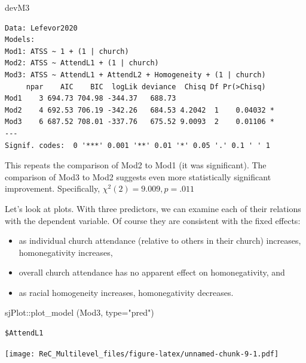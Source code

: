 \documentclass[
  english,
]{book}
\newenvironment{Shaded}{\begin{snugshade}}{\end{snugshade}}
\newcommand{\AttributeTok}[1]{\textcolor[rgb]{0.77,0.63,0.00}{#1}}
\newcommand{\FunctionTok}[1]{\textcolor[rgb]{0.00,0.00,0.00}{#1}}
\newcommand{\NormalTok}[1]{#1}
\newcommand{\SpecialCharTok}[1]{\textcolor[rgb]{0.00,0.00,0.00}{#1}}
\newcommand{\StringTok}[1]{\textcolor[rgb]{0.31,0.60,0.02}{#1}}
\providecommand{\tightlist}{%
  \setlength{\itemsep}{0pt}\setlength{\parskip}{0pt}}
\begin{document}
\begin{Shaded}
\begin{Highlighting}[]
\NormalTok{devM3}
\end{Highlighting}
\end{Shaded}

\begin{verbatim}
Data: Lefevor2020
Models:
Mod1: ATSS ~ 1 + (1 | church)
Mod2: ATSS ~ AttendL1 + (1 | church)
Mod3: ATSS ~ AttendL1 + AttendL2 + Homogeneity + (1 | church)
     npar    AIC    BIC  logLik deviance  Chisq Df Pr(>Chisq)  
Mod1    3 694.73 704.98 -344.37   688.73                       
Mod2    4 692.53 706.19 -342.26   684.53 4.2042  1    0.04032 *
Mod3    6 687.52 708.01 -337.76   675.52 9.0093  2    0.01106 *
---
Signif. codes:  0 '***' 0.001 '**' 0.01 '*' 0.05 '.' 0.1 ' ' 1
\end{verbatim}

This repeats the comparison of Mod2 to Mod1 (it was significant). The comparison of Mod3 to Mod2 suggests even more statistically significant improvement. Specifically, \(\chi ^{2}(2) = 9.009, p = .011\)

Let's look at plots. With three predictors, we can examine each of their relations with the dependent variable. Of course they are consistent with the fixed effects:

\begin{itemize}
\tightlist
\item
  as individual church attendance (relative to others in their church) increases, homonegativity increases,
\item
  overall church attendance has no apparent effect on homonegativity, and
\item
  as racial homogeneity increases, homonegativity decreases.
\end{itemize}

\begin{Shaded}
\begin{Highlighting}[]
\NormalTok{sjPlot}\SpecialCharTok{::}\FunctionTok{plot\_model}\NormalTok{ (Mod3, }\AttributeTok{type=}\StringTok{"pred"}\NormalTok{)}
\end{Highlighting}
\end{Shaded}

\begin{verbatim}
$AttendL1
\end{verbatim}

\texttt{[image: ReC\_Multilevel\_files/figure-latex/unnamed-chunk-9-1.pdf]}
\end{document}
